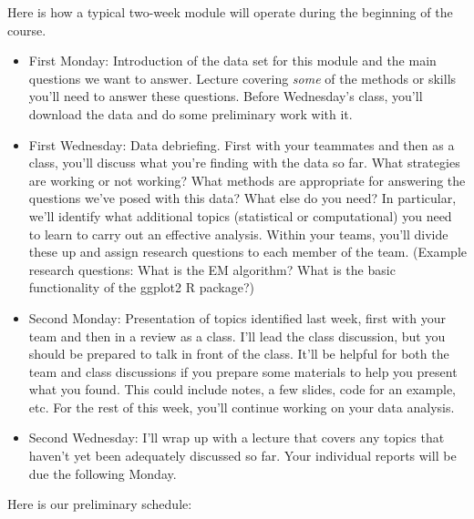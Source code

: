 \documentclass[11pt]{article}
\begin{document}
Here is how a typical two-week module will operate during the beginning of the course.

\begin{itemize}
\item First Monday: Introduction of the data set for this module and the main questions we want to answer. Lecture covering {\em some} of the methods or skills you'll need to answer these questions. Before Wednesday's class, you'll download the data and do some preliminary work with it.
\item First Wednesday: Data debriefing. First with your teammates and then as a class, you'll discuss what you're finding with the data so far. What strategies are working or not working? What methods are appropriate for answering the questions we've posed with this data? What else do you need? In particular, we'll identify what additional topics (statistical or computational) you need to learn to carry out an effective analysis. Within your teams, you'll divide these up and assign research questions to each member of the team. (Example research questions: What is the EM algorithm? What is the basic functionality of the ggplot2 R package?)

\item Second Monday: Presentation of topics identified last week, first with your team and then in a review as a class. I'll lead the class discussion, but you should be prepared to talk in front of the class. It'll be helpful for both the team and class discussions if you prepare some materials to help you present what you found. This could include notes, a few slides, code for an example, etc. For the rest of this week, you'll continue working on your data analysis.
\item Second Wednesday: I'll wrap up with a lecture that covers any topics that haven't yet been adequately discussed so far. Your individual reports will be due the following Monday.
\end{itemize}

Here is our preliminary schedule:
\end{document}
